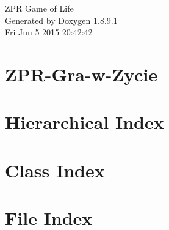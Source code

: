 \documentclass[twoside]{book}
\newcommand{\+}{\discretionary{\mbox{\scriptsize$\hookleftarrow$}}{}{}}
\newcommand{\clearemptydoublepage}{%
  \newpage{\pagestyle{empty}\cleardoublepage}%
}
\begin{document}
\hypersetup{pageanchor=false,
             bookmarks=true,
             bookmarksnumbered=true,
             pdfencoding=unicode
            }
\begin{titlepage}
\vspace*{7cm}
\begin{center}%
{\Large Z\+P\+R Game of Life }\\
\vspace*{1cm}
{\large Generated by Doxygen 1.8.9.1}\\
\vspace*{0.5cm}
{\small Fri Jun 5 2015 20:42:42}\\
\end{center}
\end{titlepage}
\clearemptydoublepage
\tableofcontents
\clearemptydoublepage
{}
\hypersetup{pageanchor=true}

\chapter{Z\+P\+R-\/\+Gra-\/w-\/\+Zycie}
\label{md__r_e_a_d_m_e}
\hypertarget{md__r_e_a_d_m_e}{}

\chapter{Hierarchical Index}

\chapter{Class Index}

\chapter{File Index}

\end{document}
